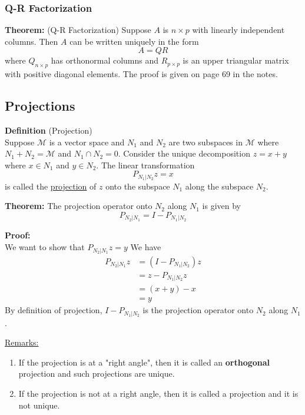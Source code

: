 \documentclass[12pt]{article}
\numberwithin{equation}{section}
\begin{document}
\subsubsection{Q-R Factorization}
\textbf{Theorem:} (Q-R Factorization)
Suppose $A$ is $n \times p$ with linearly independent columns. Then $A$ can be written uniquely in the form
\begin{equation*}
  A = QR
\end{equation*}
where $Q_{n \times p}$ has orthonormal columns and $R_{p \times p}$ is an upper triangular matrix with positive diagonal elements. The proof is given on page 69 in the notes.

\subsection{Projections}
\textbf{Definition} (Projection) \\
Suppose $\mathcal{M}$ is a vector space and $N_1$ and $N_2$ are two subspaces in $\mathcal{M}$ where $N_1 + N_2 = \mathcal{M}$ and $N_1 \cap N_2 = 0$. Consider the unique decomposition $z = x + y$ where $x \in N_1$ and $y \in N_2$. The linear transformation
\begin{equation*}
  P_{N_1 | N_2} z = x
\end{equation*}
is called the \underline{projection} of $z$ onto the subspace $N_1$ along the subspace $N_2$.

\textbf{Theorem:} The projection operator onto $N_2$ along $N_1$ is given by
\begin{equation*}
  P_{N_2 | N_1} = I - P_{N_1 | N_2}
\end{equation*}

\textbf{Proof:} \\
We want to show that $P_{N_2 | N_1} z = y$ We have
\begin{align*}
  P_{N_2 | N_1} z &= (I - P_{N_1 | N_2}) z \\
    &= z - P_{N_1 | N_2} z \\
    &= (x + y) - x \\
    &= y
\end{align*}
By definition of projection, $I - P_{N_1 | N_2}$ is the projection operator onto $N_2$ along $N_1$.

\underline{Remarks:} \\
\begin{enumerate}
  \item If the projection is at a "right angle", then it is called an \textbf{orthogonal} projection and such projections are unique.
  \item If the projection is not at a right angle, then it is called a projection and it is not unique.
\end{enumerate}
\end{document}
